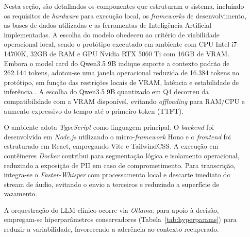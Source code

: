 

Nesta seção, são detalhados os componentes que estruturam o sistema, incluindo os requisitos de \textit{hardware} para execução local, os \textit{frameworks} de desenvolvimento, as bases de dados utilizadas e as ferramentas de Inteligência Artificial implementadas.
A escolha do modelo obedeceu ao critério de viabilidade operacional local, sendo o protótipo executado em ambiente com CPU Intel i7-14700K, 32GB de RAM e GPU Nvidia RTX 5060 Ti com 16GB de VRAM.
Embora o model card do Qwen3.5 9B indique suporte a contexto padrão de 262.144 tokens, adotou-se uma janela operacional reduzida de 16.384 tokens no protótipo, em função das restrições locais de VRAM, latência e estabilidade de inferência \cite{Qwen35ModelCard2026}.
A escolha do Qwen3.5 9B quantizado em Q4 decorreu da compatibilidade com a VRAM disponível, evitando \textit{offloading} para RAM/CPU e aumento expressivo do tempo até o primeiro token (TTFT).

O ambiente adota \textit{TypeScript} como linguagem principal.
O \textit{backend} foi desenvolvido em \textit{Node.js} utilizando o micro-\textit{framework} Hono e o \textit{frontend} foi estruturado em React, empregando Vite e TailwindCSS.
A execução em contêineres \textit{Docker} contribui para segmentação lógica e isolamento operacional, reduzindo a exposição de PII em caso de comprometimento.
Para transcrição, integra-se o \textit{Faster-Whisper} com processamento local e descarte imediato do stream de áudio, evitando o envio a terceiros e reduzindo a superfície de vazamento.

A orquestração do LLM clínico ocorre via \textit{Ollama}; para apoio à decisão, empregam-se hiperparâmetros conservadores (Tabela~\ref{tab:hyperparams}) para reduzir a variabilidade, favorecendo a aderência ao contexto recuperado.


